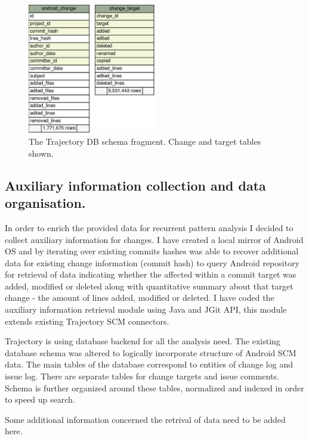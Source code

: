\documentclass[a4paper,10pt]{article}
\numberwithin{equation}{subsection}
\begin{document}
\begin{figure}
   \begin{center}
   \includegraphics[scale=0.4,width=0.5\textwidth]{schema-change-fragment}
   \end{center}
   \caption{The Trajectory DB schema fragment. Change and target tables shown.}
   \label{fig:android_downloads}
\end{figure}

\subsection{Auxiliary information collection and data organisation.}
In order to enrich the provided data for recurrent pattern analysis I decided to collect auxiliary 
information for changes. I have created a local mirror of Android OS and by iterating over existing 
commits hashes was able to recover additional data for  existing change information (commit hash) to 
query Android repository for retrieval of data indicating whether the affected within a commit target 
was added, modified or deleted along with quantitative summary about that target change - the amount of 
lines added, modified or deleted. I have coded the auxiliary information retrieval module using Java and
JGit API, this module extends existing Trajectory SCM connectors.

Trajectory is using database backend for all the analysis need. The existing database schema was altered
to logically incorporate structure of Android SCM data. The main tables of the database correspond to
entities of change log and issue log. There are separate tables for change targets and issue comments.
Schema is further organized around these tables, normalized and indexed in order to speed up search.

Some additional information concerned the retrival of data need to be added here.
\end{document}
